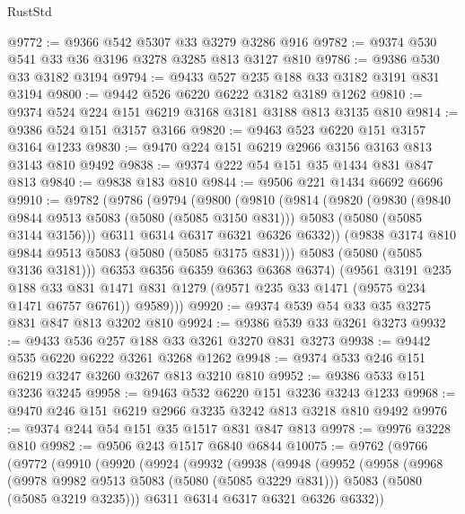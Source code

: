 \begin{lexlean}{RustStd}
\begin{coremodule}
@9772 := @9366 @542 @5307 @33 @3279 @3286 @916
@9782 := @9374 @530 @541 @33 @36 @3196 @3278 @3285 @813 @3127 @810
@9786 := @9386 @530 @33 @3182 @3194
@9794 := @9433 @527 @235 @188 @33 @3182 @3191 @831 @3194
@9800 := @9442 @526 @6220 @6222 @3182 @3189 @1262
@9810 := @9374 @524 @224 @151 @6219 @3168 @3181 @3188 @813 @3135 @810
@9814 := @9386 @524 @151 @3157 @3166
@9820 := @9463 @523 @6220 @151 @3157 @3164 @1233
@9830 := @9470 @224 @151 @6219 @2966 @3156 @3163 @813 @3143 @810 @9492
@9838 := @9374 @222 @54 @151 @35 @1434 @831 @847 @813
@9840 := @9838 @183 @810
@9844 := @9506 @221 @1434 @6692 @6696
@9910 := @9782
    (@9786
      (@9794
        (@9800
          (@9810
            (@9814
              (@9820
                (@9830
                  (@9840 @9844 @9513 @5083 (@5080 (@5085 @3150 @831)))
                  @5083
                  (@5080 (@5085 @3144 @3156)))
                @6311
                @6314
                @6317
                @6321
                @6326
                @6332))
            (@9838 @3174 @810 @9844 @9513 @5083 (@5080 (@5085 @3175 @831)))
            @5083
            (@5080 (@5085 @3136 @3181)))
          @6353
          @6356
          @6359
          @6363
          @6368
          @6374)
        (@9561
          @3191
          @235
          @188
          @33
          @831
          @1471
          @831
          @1279
          (@9571 @235 @33 @1471 (@9575 @234 @1471 @6757 @6761))
          @9589)))
@9920 := @9374 @539 @54 @33 @35 @3275 @831 @847 @813 @3202 @810
@9924 := @9386 @539 @33 @3261 @3273
@9932 := @9433 @536 @257 @188 @33 @3261 @3270 @831 @3273
@9938 := @9442 @535 @6220 @6222 @3261 @3268 @1262
@9948 := @9374 @533 @246 @151 @6219 @3247 @3260 @3267 @813 @3210 @810
@9952 := @9386 @533 @151 @3236 @3245
@9958 := @9463 @532 @6220 @151 @3236 @3243 @1233
@9968 := @9470 @246 @151 @6219 @2966 @3235 @3242 @813 @3218 @810 @9492
@9976 := @9374 @244 @54 @151 @35 @1517 @831 @847 @813
@9978 := @9976 @3228 @810
@9982 := @9506 @243 @1517 @6840 @6844
@10075 := @9762
    (@9766
      (@9772
        (@9910
          (@9920
            (@9924
              (@9932
                (@9938
                  (@9948
                    (@9952
                      (@9958
                        (@9968
                          (@9978 @9982 @9513 @5083 (@5080 (@5085 @3229 @831)))
                          @5083
                          (@5080 (@5085 @3219 @3235)))
                        @6311
                        @6314
                        @6317
                        @6321
                        @6326
                        @6332))

\end{coremodule}
\end{lexlean}
